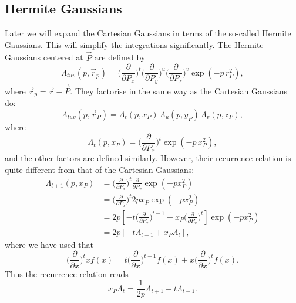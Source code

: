 \subsection{Hermite Gaussians}
Later we will expand the Cartesian Gaussians in terms of the so-called Hermite Gaussians.
This will simplify the integrations significantly. The Hermite Gaussians centered at $\vec P$ are defined by
\begin{equation}
 \Lambda_{tuv}(p, \vec r_p) = \Big(\frac{\partial}{\partial P_x}\Big)^t \Big(\frac{\partial}{\partial P_y}\Big)^u \Big(\frac{\partial}{\partial P_z}\Big)^v \exp(-p\, r^2_P),
\end{equation}
where $\vec r_p = \vec r - \vec P$. They factorise in the same way as the Cartesian Gaussians do:
\begin{equation}
 \Lambda_{tuv}(p, \vec r_P) = \Lambda_t(p,x_P)\,\Lambda_u(p,y_P)\,\Lambda_v(p,z_P),
\end{equation}
where
\begin{equation}
\label{eq:HermiteGaussian_x}
 \Lambda_t(p,x_P) = \Big(\frac{\partial}{\partial P_x}\Big)^t \exp(-p\,x^2_P),
\end{equation}
and the other factors are defined similarly. However, their recurrence relation is quite different from that of the Cartesian Gaussians:
\begin{equation}
\begin{split}
 \Lambda_{t+1}(p,x_P) & = \Big(\frac{\partial}{\partial P_x}\Big)^t \frac{\partial}{\partial P_x}\exp(-px^2_P) \\
                      & = \Big(\frac{\partial}{\partial P_x}\Big)^t 2px_P \exp(-px^2_P)  \\
                      & = 2p[-t\Big(\frac{\partial}{\partial P_x}\Big)^{t-1} + x_P \Big(\frac{\partial}{\partial P_x}\Big)^t] \exp(-px^2_P) \\
                      & = 2p[-t\Lambda_{t-1} + x_P \Lambda_t],
\end{split}
\end{equation}
where we have used that
\begin{equation}
\label{eq:derivation_rule}
 \Big(\frac{\partial}{\partial x}\Big)^t x f(x) = t\Big(\frac{\partial}{\partial x}\Big)^{t-1}f(x) + x\Big(\frac{\partial}{\partial x}\Big)^t f(x).
\end{equation}
Thus the recurrence relation reads
\begin{equation}
\label{eq:hermite_gaussian_recurrence}
 x_P \Lambda_t = \frac{1}{2p}\Lambda_{t+1} + t\Lambda_{t-1}.
\end{equation}





